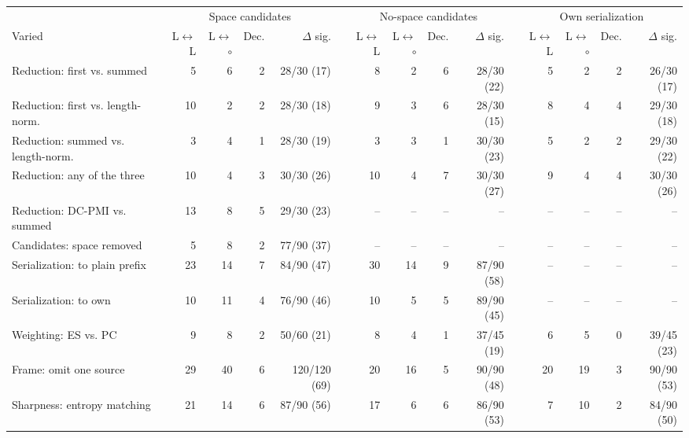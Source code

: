 \begin{table}[t]
\centering\scriptsize
\setlength{\tabcolsep}{3.5pt}
\begin{tabular}{@{}lrrrrrrrrrrrrrr@{}}
\toprule
& \multicolumn{4}{c}{Space candidates} & & \multicolumn{4}{c}{No-space candidates} & & \multicolumn{4}{c}{Own serialization} \\
\cmidrule(lr){2-5}\cmidrule(lr){7-10}\cmidrule(l){12-15}
Varied & L$\leftrightarrow$L & L$\leftrightarrow$$\circ$ & Dec. & $\Delta$ sig. & & L$\leftrightarrow$L & L$\leftrightarrow$$\circ$ & Dec. & $\Delta$ sig. & & L$\leftrightarrow$L & L$\leftrightarrow$$\circ$ & Dec. & $\Delta$ sig. \\
\midrule
Reduction: first vs. summed & 5 & 6 & 2 & 28/30 (17) & & 8 & 2 & 6 & 28/30 (22) & & 5 & 2 & 2 & 26/30 (17) \\
Reduction: first vs. length-norm. & 10 & 2 & 2 & 28/30 (18) & & 9 & 3 & 6 & 28/30 (15) & & 8 & 4 & 4 & 29/30 (18) \\
Reduction: summed vs. length-norm. & 3 & 4 & 1 & 28/30 (19) & & 3 & 3 & 1 & 30/30 (23) & & 5 & 2 & 2 & 29/30 (22) \\
Reduction: any of the three & 10 & 4 & 3 & 30/30 (26) & & 10 & 4 & 7 & 30/30 (27) & & 9 & 4 & 4 & 30/30 (26) \\
Reduction: DC-PMI vs. summed & 13 & 8 & 5 & 29/30 (23) & & -- & -- & -- & -- & & -- & -- & -- & -- \\
Candidates: space removed & 5 & 8 & 2 & 77/90 (37) & & -- & -- & -- & -- & & -- & -- & -- & -- \\
Serialization: to plain prefix & 23 & 14 & 7 & 84/90 (47) & & 30 & 14 & 9 & 87/90 (58) & & -- & -- & -- & -- \\
Serialization: to own & 10 & 11 & 4 & 76/90 (46) & & 10 & 5 & 5 & 89/90 (45) & & -- & -- & -- & -- \\
Weighting: ES vs. PC & 9 & 8 & 2 & 50/60 (21) & & 8 & 4 & 1 & 37/45 (19) & & 6 & 5 & 0 & 39/45 (23) \\
Frame: omit one source & 29 & 40 & 6 & 120/120 (69) & & 20 & 16 & 5 & 90/90 (48) & & 20 & 19 & 3 & 90/90 (53) \\
Sharpness: entropy matching & 21 & 14 & 6 & 87/90 (56) & & 17 & 6 & 6 & 86/90 (53) & & 7 & 10 & 2 & 84/90 (50) \\
\bottomrule
\end{tabular}

\end{table}
